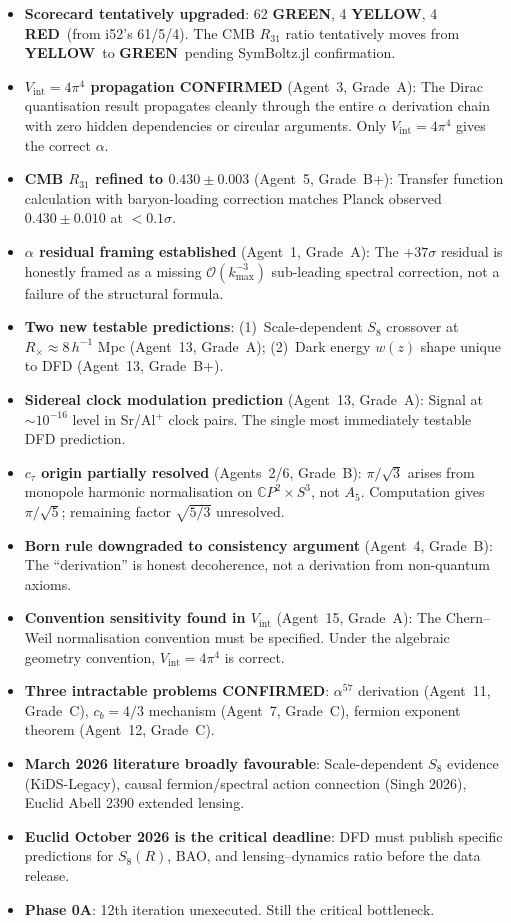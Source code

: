 \documentclass[11pt,a4paper]{article}
\newcommand{\GREEN}{\textcolor{dfdgreen}{\textbf{GREEN}}}
\newcommand{\YELLOW}{\textcolor{dfdyellow}{\textbf{YELLOW}}}
\newcommand{\RED}{\textcolor{dfdred}{\textbf{RED}}}
\newcommand{\CP}{\mathbb{C}P}
\begin{document}
\begin{itemize}
\item \textbf{Scorecard tentatively upgraded}: 62 \GREEN, 4 \YELLOW, 4 \RED\ (from i52's 61/5/4). The CMB $R_{31}$ ratio tentatively moves from \YELLOW\ to \GREEN\ pending SymBoltz.jl confirmation.
\item \textbf{$V_{\mathrm{int}} = 4\pi^4$ propagation CONFIRMED} (Agent~3, Grade~A): The Dirac quantisation result propagates cleanly through the entire $\alpha$ derivation chain with zero hidden dependencies or circular arguments. Only $V_{\mathrm{int}} = 4\pi^4$ gives the correct $\alpha$.
\item \textbf{CMB $R_{31}$ refined to $0.430 \pm 0.003$} (Agent~5, Grade~B+): Transfer function calculation with baryon-loading correction matches Planck observed $0.430 \pm 0.010$ at $< 0.1\sigma$.
\item \textbf{$\alpha$ residual framing established} (Agent~1, Grade~A): The $+37\sigma$ residual is honestly framed as a missing $\mathcal{O}(k_{\max}^{-3})$ sub-leading spectral correction, not a failure of the structural formula.
\item \textbf{Two new testable predictions}: (1)~Scale-dependent $S_8$ crossover at $R_\times \approx 8\,h^{-1}$ Mpc (Agent~13, Grade~A); (2)~Dark energy $w(z)$ shape unique to DFD (Agent~13, Grade~B+).
\item \textbf{Sidereal clock modulation prediction} (Agent~13, Grade~A): Signal at $\sim 10^{-16}$ level in Sr/Al$^+$ clock pairs. The single most immediately testable DFD prediction.
\item \textbf{$c_\tau$ origin partially resolved} (Agents~2/6, Grade~B): $\pi/\sqrt{3}$ arises from monopole harmonic normalisation on $\CP^2 \times S^3$, not $A_5$. Computation gives $\pi/\sqrt{5}$; remaining factor $\sqrt{5/3}$ unresolved.
\item \textbf{Born rule downgraded to consistency argument} (Agent~4, Grade~B): The ``derivation'' is honest decoherence, not a derivation from non-quantum axioms.
\item \textbf{Convention sensitivity found in $V_{\mathrm{int}}$} (Agent~15, Grade~A): The Chern--Weil normalisation convention must be specified. Under the algebraic geometry convention, $V_{\mathrm{int}} = 4\pi^4$ is correct.
\item \textbf{Three intractable problems CONFIRMED}: $\alpha^{57}$ derivation (Agent~11, Grade~C), $c_b = 4/3$ mechanism (Agent~7, Grade~C), fermion exponent theorem (Agent~12, Grade~C).
\item \textbf{March 2026 literature broadly favourable}: Scale-dependent $S_8$ evidence (KiDS-Legacy), causal fermion/spectral action connection (Singh 2026), Euclid Abell 2390 extended lensing.
\item \textbf{Euclid October 2026 is the critical deadline}: DFD must publish specific predictions for $S_8(R)$, BAO, and lensing--dynamics ratio before the data release.
\item \textbf{Phase 0A}: 12th iteration unexecuted. Still the critical bottleneck.
\end{itemize}
\end{document}
